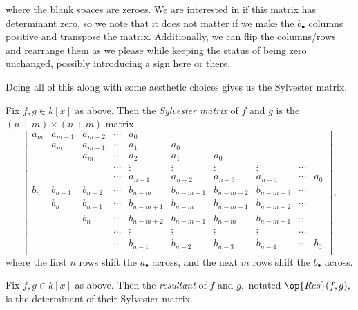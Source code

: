 \documentclass[../notes.tex]{subfiles}
\begin{document}
where the blank spaces are zeroes. We are interested in if this matrix has determinant zero, so we note that it does not matter if we make the $b_\bullet$ columns positive and transpose the matrix. Additionally, we can flip the columns/rows and rearrange them as we please while keeping the status of being zero unchanged, possibly introducing a sign here or there.

Doing all of this along with some aesthetic choices gives us the Sylvester matrix.
\begin{definition}
	Fix $f,g\in k[x]$ as above. Then the \textit{Sylvester matrix} of $f$ and $g$ is the $(n+m)\times(n+m)$ matrix
	\[\begin{bmatrix}
		a_m & a_{m-1} & a_{m-2} & \cdots & a_0       &           &           &           &        &     \\
			& a_m     & a_{m-1} & \cdots & a_1       & a_0       &           &           &        &     \\
			&         & a_m     & \cdots & a_2       & a_1       & a_0       &           &        &     \\
			&         &         & \cdots & \vdots    & \vdots    & \vdots    & \vdots    & \cdots &     \\
			&         &         & \cdots & a_{n-1}   & a_{n-2}   & a_{n-3}   & a_{n-4}   & \cdots & a_0 \\
		b_n & b_{n-1} & b_{n-2} & \cdots & b_{n-m}   & b_{n-m-1} & b_{n-m-2} & b_{n-m-3} & \cdots &     \\
			& b_n     & b_{n-1} & \cdots & b_{n-m+1} & b_{n-m}   & b_{n-m-1} & b_{n-m-2} & \cdots &     \\
			&         & b_n     & \cdots & b_{n-m+2} & b_{n-m+1} & b_{n-m}   & b_{n-m-1} & \cdots &     \\
			&         &         & \cdots & \vdots    & \vdots    & \vdots    & \vdots    & \cdots &     \\
			&         &         & \cdots & b_{n-1}   & b_{n-2}   & b_{n-3}   & b_{n-4}   & \cdots & b_0 \\
	\end{bmatrix},\]
	where the first $n$ rows shift the $a_\bullet$ across, and the next $m$ rows shift the $b_\bullet$ across.
\end{definition}
\begin{definition}[Resultant]
	Fix $f,g\in k[x]$ as above. Then the \textit{resultant} of $f$ and $g,$ notated $\op{Res}(f,g),$ is the determinant of their Sylvester matrix.
\end{definition}
\end{document}
